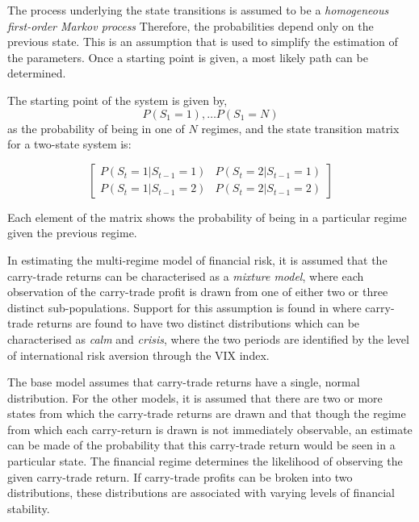 \documentclass[12pt, a4paper, oneside]{article}\usepackage[]{graphicx}\usepackage[]{color}
\begin{document}
The process underlying the state transitions is assumed to be a \emph{homogeneous first-order Markov process}  Therefore, the probabilities depend only on the previous state. This is an assumption that is used to simplify the estimation of the parameters. Once a starting point is given, a most likely path can be determined. 


The starting point of the system is given by,
\begin{equation*}
P(S_1 = 1), \dots P(S_1 = N)
\end{equation*}
as the probability of being in one of $N$ regimes, and the state transition matrix for a two-state system is:

\begin{equation*}
\begin{bmatrix}
P(S_t = 1|S_{t-1}=1)  & P(S_t = 2|S_{t-1}=1)\\
P(S_t = 1|S_{t-1}=2)  & P(S_t = 2|S_{t-1}=2)
\end{bmatrix}
\end{equation*}

Each element of the matrix shows the probability of being in a particular regime given the previous regime. 

In estimating the multi-regime model of financial risk, it is assumed that the carry-trade returns can be characterised as a \emph{mixture model}, where each observation of the carry-trade profit is drawn from one of either two or three distinct sub-populations.   Support for this assumption is found in \citet{Hayward2013} where carry-trade returns are found to have two distinct distributions which can be characterised as \emph{calm} and \emph{crisis}, where the two periods are identified by the level of international risk aversion through the VIX index. 

The base model assumes that carry-trade returns have a single, normal distribution. For the other models, it is assumed that there are two or more states from which the carry-trade returns are drawn and that though the regime from which each carry-return is drawn is not immediately observable, an estimate can be made of the probability that this carry-trade return would be seen in a particular state. The financial regime determines the likelihood of observing the given carry-trade return.  If carry-trade profits can be broken into two distributions, these distributions are associated with varying levels of financial stability.  

 
\end{document}
